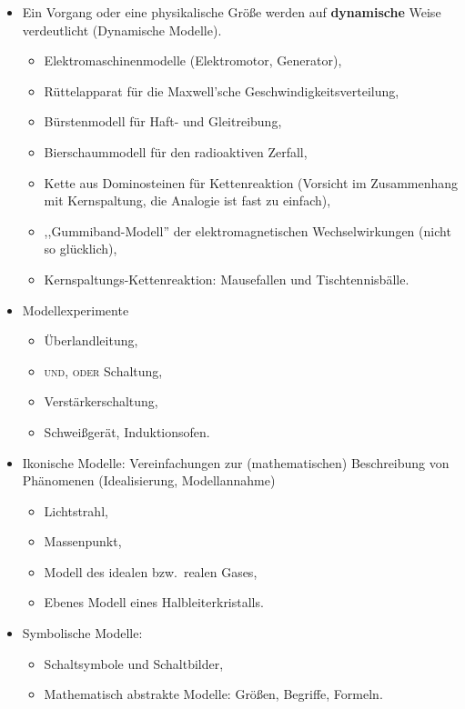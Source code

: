 \begin{enumerate}
\begin{itemize}
\item
Ein Vorgang oder eine physikalische Gr\"{o}{\ss}e werden auf {\bf dynamische}
Weise verdeutlicht (Dynamische Modelle).
\begin{itemize}
\item Elektromaschinenmodelle (Elektromotor, Generator),
\item R\"{u}ttelapparat f\"{u}r die Maxwell'sche Geschwindigkeitsverteilung,
\item B\"{u}rstenmodell f\"{u}r Haft- und Gleitreibung,
\item Bierschaummodell f\"{u}r den radioaktiven Zerfall,
\item Kette aus Dominosteinen f\"{u}r Kettenreaktion (Vorsicht im
Zusammenhang mit Kernspaltung, die Analogie ist fast zu einfach),
\item ,,Gummiband-Modell''
der elektromagnetischen Wechselwirkungen (nicht so gl\"{u}cklich),
\item Kernspaltungs-Kettenreaktion: Mausefallen und Tischtennisb\"{a}lle.
\end{itemize}

\item
Modellexperimente
\begin{itemize}
\item
\"{U}berlandleitung,
\item
\textsc{und}, \textsc{oder} Schaltung,
\item
Verst\"{a}rkerschaltung,
\item
Schwei{\ss}ger\"{a}t, Induktionsofen.
\end{itemize}

\item
Ikonische Modelle: Vereinfachungen zur (mathematischen)
Beschreibung von Ph\"{a}nomenen (Idealisierung, Modellannahme)
\begin{itemize}
\item Lichtstrahl,
\item Massenpunkt,
\item Modell des idealen bzw.\ realen Gases,
\item Ebenes Modell eines Halbleiterkristalls.
\end{itemize}

\item
Symbolische Modelle:
\begin{itemize}
\item Schaltsymbole und Schaltbilder,
\item Mathematisch abstrakte Modelle: Gr\"{o}{\ss}en, Begriffe, Formeln.
\end{itemize}


\end{itemize}
\end{enumerate}
